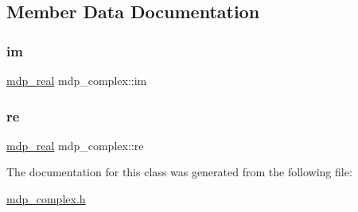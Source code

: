 \subsection{Member Data Documentation}
\mbox{\label{classmdp__complex_ab1d9712d92fea8db3d65ccfdee49adaa}} 
\subsubsection{\texorpdfstring{im}{im}}
{\footnotesize\ttfamily \hyperlink{mdp__global__vars_8h_a69d96b74c791e0bbdb888b3913a69450}{mdp\+\_\+real} mdp\+\_\+complex\+::im}

\mbox{\label{classmdp__complex_abd6f1624347c6acca19f089047c1a995}} 
\subsubsection{\texorpdfstring{re}{re}}
{\footnotesize\ttfamily \hyperlink{mdp__global__vars_8h_a69d96b74c791e0bbdb888b3913a69450}{mdp\+\_\+real} mdp\+\_\+complex\+::re}



The documentation for this class was generated from the following file\+:\begin{DoxyCompactItemize}
\item 
\hyperlink{mdp__complex_8h}{mdp\+\_\+complex.\+h}\end{DoxyCompactItemize}
